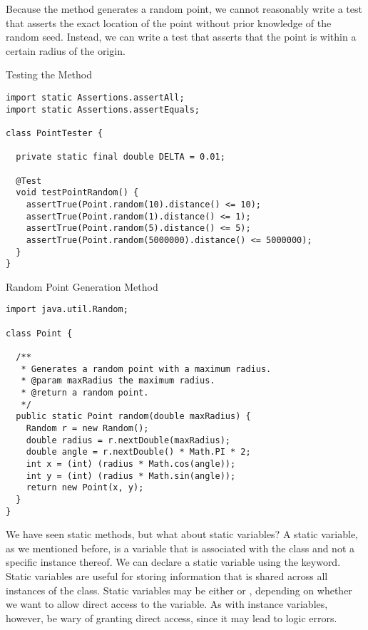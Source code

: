 Because the  method generates a random point, we cannot reasonably write a test that asserts the exact location of the point without prior knowledge of the random seed. Instead, we can write a test that asserts that the point is within a certain radius of the origin. 

\begin{cl}{Testing the  Method}
\begin{lstlisting}[language=MyJava]
import static Assertions.assertAll;
import static Assertions.assertEquals;

class PointTester {

  private static final double DELTA = 0.01;

  @Test
  void testPointRandom() {
    assertTrue(Point.random(10).distance() <= 10);
    assertTrue(Point.random(1).distance() <= 1);
    assertTrue(Point.random(5).distance() <= 5);
    assertTrue(Point.random(5000000).distance() <= 5000000);
  }
}
\end{lstlisting}
\end{cl}

\begin{cl}{Random Point Generation Method}
\begin{lstlisting}[language=MyJava]
import java.util.Random;

class Point {

  /**
   * Generates a random point with a maximum radius.
   * @param maxRadius the maximum radius.
   * @return a random point.
   */
  public static Point random(double maxRadius) {
    Random r = new Random();
    double radius = r.nextDouble(maxRadius);
    double angle = r.nextDouble() * Math.PI * 2;
    int x = (int) (radius * Math.cos(angle));
    int y = (int) (radius * Math.sin(angle));
    return new Point(x, y);
  }
}
\end{lstlisting}
\end{cl}

We have seen static methods, but what about static variables? A static variable, as we mentioned before, is a variable that is associated with the class and not a specific instance thereof. We can declare a static variable using the  keyword. Static variables are useful for storing information that is shared across all instances of the class. Static variables may be either  or , depending on whether we want to allow direct access to the variable. As with instance variables, however, be wary of granting direct access, since it may lead to logic errors.

